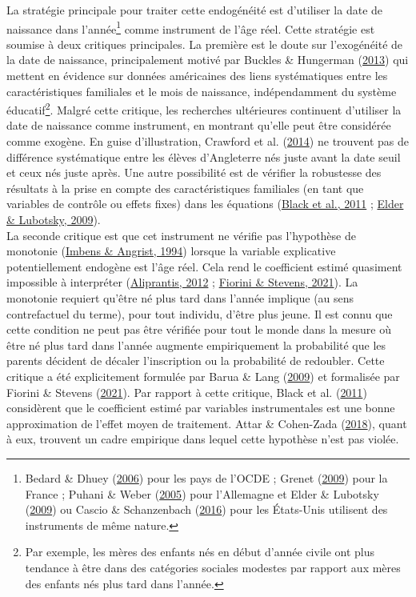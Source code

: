 \documentclass[
]{book}
\begin{document}
\quad La stratégie principale pour traiter cette endogénéité est d'utiliser la date de naissance dans l'année\footnote{Bedard \& Dhuey (\protect\hyperlink{ref-BED:DHU:06}{2006}) pour les pays de l'OCDE ; Grenet (\protect\hyperlink{ref-GRE:09}{2009}) pour la France ; Puhani \& Weber (\protect\hyperlink{ref-PUH:WEB:05}{2005}) pour l'Allemagne et Elder \& Lubotsky (\protect\hyperlink{ref-ELD:LUB:09}{2009}) ou Cascio \& Schanzenbach (\protect\hyperlink{ref-CAS:SCH:16}{2016}) pour les États-Unis utilisent des instruments de même nature.} comme instrument de l'âge réel. Cette stratégie est soumise à deux critiques principales. La première est le doute sur l'exogénéité de la date de naissance, principalement motivé par Buckles \& Hungerman (\protect\hyperlink{ref-BUC:HUN:13}{2013}) qui mettent en évidence sur données américaines des liens systématiques entre les caractéristiques familiales et le mois de naissance, indépendamment du système éducatif\footnote{Par exemple, les mères des enfants nés en début d'année civile ont plus tendance à être dans des catégories sociales modestes par rapport aux mères des enfants nés plus tard dans l'année.}. Malgré cette critique, les recherches ultérieures continuent d'utiliser la date de naissance comme instrument, en montrant qu'elle peut être considérée comme exogène. En guise d'illustration, Crawford et al. (\protect\hyperlink{ref-CRA:eal:14}{2014}) ne trouvent pas de différence systématique entre les élèves d'Angleterre nés juste avant la date seuil et ceux nés juste après. Une autre possibilité est de vérifier la robustesse des résultats à la prise en compte des caractéristiques familiales (en tant que variables de contrôle ou effets fixes) dans les équations (\protect\hyperlink{ref-BLA:eal:11}{Black et al., 2011} ; \protect\hyperlink{ref-ELD:LUB:09}{Elder \& Lubotsky, 2009}).\\
La seconde critique est que cet instrument ne vérifie pas l'hypothèse de monotonie (\protect\hyperlink{ref-IMB:ANG:94}{Imbens \& Angrist, 1994}) lorsque la variable explicative potentiellement endogène est l'âge réel. Cela rend le coefficient estimé quasiment impossible à interpréter (\protect\hyperlink{ref-ALI:12TRUE}{Aliprantis, 2012} ; \protect\hyperlink{ref-FIO:STE:21}{Fiorini \& Stevens, 2021}). La monotonie requiert qu'être né plus tard dans l'année implique (au sens contrefactuel du terme), pour tout individu, d'être plus jeune. Il est connu que cette condition ne peut pas être vérifiée pour tout le monde dans la mesure où être né plus tard dans l'année augmente empiriquement la probabilité que les parents décident de décaler l'inscription ou la probabilité de redoubler. Cette critique a été explicitement formulée par Barua \& Lang (\protect\hyperlink{ref-BAR:LAN:09}{2009}) et formalisée par Fiorini \& Stevens (\protect\hyperlink{ref-FIO:STE:21}{2021}). Par rapport à cette critique, Black et al. (\protect\hyperlink{ref-BLA:eal:11}{2011}) considèrent que le coefficient estimé par variables instrumentales est une bonne approximation de l'effet moyen de traitement. Attar \& Cohen-Zada (\protect\hyperlink{ref-ATT:COH:18}{2018}), quant à eux, trouvent un cadre empirique dans lequel cette hypothèse n'est pas violée.\\
\end{document}
